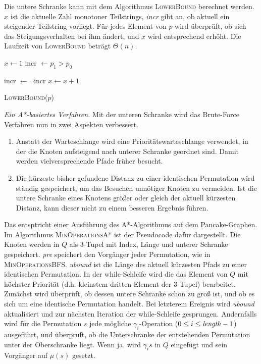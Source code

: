 \documentclass[a4paper, 10pt, ngerman]{article}
\begin{document}
Die untere Schranke kann mit dem Algorithmus \textsc{LowerBound} berechnet werden. $x$ ist die aktuelle Zahl monotoner Teilstrings, \emph{incr} gibt an, ob aktuell ein steigender Teilstring vorliegt. Für jedes Element von $p$ wird überprüft, ob sich das Steigungsverhalten bei ihm ändert, und $x$ wird entsprechend erhöht. Die Laufzeit von \textsc{LowerBound} beträgt $\Theta(n)$.

\begin{algorithm}
    {
         \;
    }

    $x \gets 1$ \;
    incr $\gets p_1 > p_0$ \;

    {
        {
            incr $\gets \neg$incr \;
            $x \gets x + 1$ \;
        }
    }

     \;

    \caption{\textsc{LowerBound}($p$)}
\end{algorithm}

\emph{{Ein A*-basiertes Verfahren.}} Mit der unteren Schranke wird das Brute-Force Verfahren nun in zwei Aspekten verbessert.

\begin{enumerate}
    \item Anstatt der Warteschlange wird eine Prioritätswarteschlange verwendet, in der die Knoten aufsteigend nach unterer Schranke geordnet sind. Damit werden vielversprechende Pfade früher besucht.
    \item Die kürzeste bisher gefundene Distanz zu einer identischen Permutation wird ständig gespeichert, um das Besuchen unnötiger Knoten zu vermeiden. Ist die untere Schranke eines Knotens größer oder gleich der aktuell kürzesten Distanz, kann dieser nicht zu einem besseren Ergebnis führen.
\end{enumerate}

Das entsptricht einer Ausführung des A*-Algorithmus auf dem Pancake-Graphen. Im Algorithmus \textsc{MinOperationsA*} ist der Pseudocode dafür dargestellt. Die Knoten werden in $Q$ als 3-Tupel mit Index, Länge und unterer Schranke gespeichert. \emph{pre} speichert den Vorgänger jeder Permutation, wie in \textsc{MinOperationsBFS}. \emph{ubound} ist die Länge des aktuell kürzesten Pfads zu einer identischen Permutation. In der while-Schleife wird die das Element von $Q$ mit höchster Priorität (d.h. kleinstem dritten Element der 3-Tupel) bearbeitet. Zunächst wird überprüft, ob dessen untere Schranke schon zu groß ist, und ob es sich um eine identische Permutation handelt. Bei letzterem Ereignis wird \emph{ubound} aktualisiert und zur nächsten Iteration der while-Schleife gesprungen. Andernfalls wird für die Permutation $s$ jede mögliche $\gamma_i$-Operation ($0 \le i \le \emph{length} - 1$) ausgeführt, und überprüft, ob die Unterschranke der entstehenden Permutation unter der Oberschranke liegt. Wenn ja, wird $\gamma_i s$ in $Q$ eingefügt und sein Vorgänger auf $\mu(s)$ gesetzt.
\end{document}

